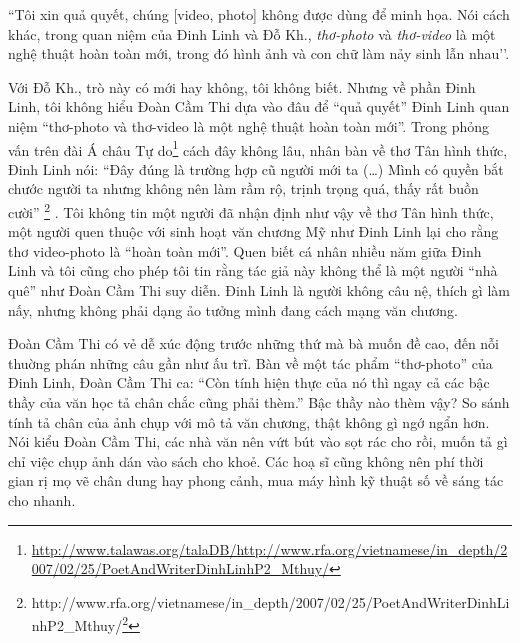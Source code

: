 \documentclass[../main.tex]{subfiles}
\begin{document}
\begin{multicols}{2}
“Tôi xin quả quyết, chúng [video, photo] không được dùng để minh họa. Nói cách khác, trong quan niệm của Đinh Linh và Đỗ Kh., \textit{thơ-photo} và \textit{thơ-video} là một nghệ thuật hoàn toàn mới, trong đó hình ảnh và con chữ làm nảy sinh lẫn nhau’’. 

Với Đỗ Kh., trò này có mới hay không, tôi không biết. Nhưng về phần Đinh Linh, tôi không hiểu Đoàn Cầm Thi dựa vào đâu để “quả quyết” Đinh Linh quan niệm “thơ-photo và thơ-video là một nghệ thuật hoàn toàn mới”. Trong phỏng vấn trên đài Á châu Tự do\footnote{\url{http://www.talawas.org/talaDB/http://www.rfa.org/vietnamese/in_depth/2007/02/25/PoetAndWriterDinhLinhP2_Mthuy/}} cách đây không lâu, nhân bàn về thơ Tân hình thức, Đinh Linh nói: “Đây đúng là trường hợp cũ người mới ta (…) Mình có quyền bắt chước người ta nhưng không nên làm rầm rộ, trịnh trọng quá, thấy rất buồn cười” \footnote{
http://www.rfa.org/vietnamese/in_depth/2007/02/25/PoetAndWriterDinhLinhP2_Mthuy/\footnote{\url{http://www.talawas.org/talaDB/http://www.rfa.org/vietnamese/in_depth/2007/02/25/PoetAndWriterDinhLinhP2_Mthuy/}}} . Tôi không tin một người đã nhận định như vậy về thơ Tân hình thức, một người quen thuộc với sinh hoạt văn chương Mỹ như Đinh Linh lại cho rằng thơ video-photo là “hoàn toàn mới”. Quen biết cá nhân nhiều năm giữa Đinh Linh và tôi cũng cho phép tôi tin rằng tác giả này không thể là một người “nhà quê” như Đoàn Cầm Thi suy diễn. Đinh Linh là người không câu nệ, thích gì làm nấy, nhưng không phải dạng ảo tưởng mình đang cách mạng văn chương. 

Đoàn Cầm Thi có vẻ dễ xúc động trước những thứ mà bà muốn đề cao, đến nỗi thuờng phán những câu gần như ấu trĩ. Bàn về một tác phẩm “thơ-photo” của Đinh Linh, Đoàn Cầm Thi ca: “Còn tính hiện thực của nó thì ngay cả các bậc thầy của văn học tả chân chắc cũng phải thèm.” Bậc thầy nào thèm vậy? So sánh tính tả chân của ảnh chụp với mô tả văn chương, thật không gì ngớ ngẩn hơn. Nói kiểu Đoàn Cầm Thi, các nhà văn nên vứt bút vào sọt rác cho rồi, muốn tả gì chỉ việc chụp ảnh dán vào sách cho khoẻ. Các hoạ sĩ cũng không nên phí thời gian rị mọ vẽ chân dung hay phong cảnh, mua máy hình kỹ thuật số về sáng tác cho nhanh. 


\end{multicols}
\end{document}
